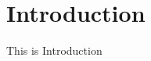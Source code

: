 \documentclass{article}
\begin{document}
    \section*{Introduction}
    This is Introduction
\end{document}
